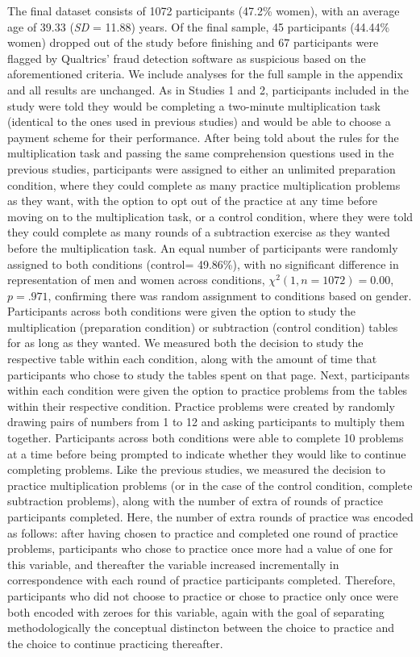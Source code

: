\documentclass[a4paper,nobind]{templates/ociamthesis}
\begin{document}
The final dataset consists of 1072 participants (47.2\% women), with an average age of 39.33 (\emph{SD} = 11.88) years. Of the final sample, 45 participants (44.44\% women) dropped out of the study before finishing and 67 participants were flagged by Qualtrics' fraud detection software as suspicious based on the aforementioned criteria. We include analyses for the full sample in the appendix and all results are unchanged. As in Studies 1 and 2, participants included in the study were told they would be completing a two-minute multiplication task (identical to the ones used in previous studies) and would be able to choose a payment scheme for their performance. After being told about the rules for the multiplication task and passing the same comprehension questions used in the previous studies, participants were assigned to either an unlimited preparation condition, where they could complete as many practice multiplication problems as they want, with the option to opt out of the practice at any time before moving on to the multiplication task, or a control condition, where they were told they could complete as many rounds of a subtraction exercise as they wanted before the multiplication task. An equal number of participants were randomly assigned to both conditions (control= 49.86\%), with no significant difference in representation of men and women across conditions, \(\chi^2(1, n = 1072) = 0.00\), \(p = .971\), confirming there was random assignment to conditions based on gender. Participants across both conditions were given the option to study the multiplication (preparation condition) or subtraction (control condition) tables for as long as they wanted. We measured both the decision to study the respective table within each condition, along with the amount of time that participants who chose to study the tables spent on that page. Next, participants within each condition were given the option to practice problems from the tables within their respective condition. Practice problems were created by randomly drawing pairs of numbers from 1 to 12 and asking participants to multiply them together. Participants across both conditions were able to complete 10 problems at a time before being prompted to indicate whether they would like to continue completing problems. Like the previous studies, we measured the decision to practice multiplication problems (or in the case of the control condition, complete subtraction problems), along with the number of extra of rounds of practice participants completed. Here, the number of extra rounds of practice was encoded as follows: after having chosen to practice and completed one round of practice problems, participants who chose to practice once more had a value of one for this variable, and thereafter the variable increased incrementally in correspondence with each round of practice participants completed. Therefore, participants who did not choose to practice or chose to practice only once were both encoded with zeroes for this variable, again with the goal of separating methodologically the conceptual distincton between the choice to practice and the choice to continue practicing thereafter.
\end{document}

